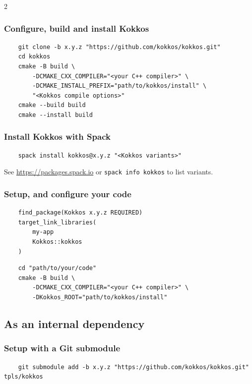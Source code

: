 \documentclass[
    kokkoshighlight,
]{./cheat_sheet_kokkos}
\begin{document}
\begin{multicols}{2}
\subsubsection{Configure, build and install Kokkos}

\begin{verbatim}
    git clone -b x.y.z "https://github.com/kokkos/kokkos.git"
    cd kokkos
    cmake -B build \
        -DCMAKE_CXX_COMPILER="<your C++ compiler>" \
        -DCMAKE_INSTALL_PREFIX="path/to/kokkos/install" \
        "<Kokkos compile options>"
    cmake --build build
    cmake --install build
\end{verbatim}

\subsubsection{Install Kokkos with Spack}

\begin{verbatim}
    spack install kokkos@x.y.z "<Kokkos variants>"
\end{verbatim}

See \url{https://packages.spack.io} or \texttt{spack info kokkos} to list variants.

\subsubsection{Setup, and configure your code}

\begin{verbatim}
    find_package(Kokkos x.y.z REQUIRED)
    target_link_libraries(
        my-app
        Kokkos::kokkos
    )
\end{verbatim}

\begin{verbatim}
    cd "path/to/your/code"
    cmake -B build \
        -DCMAKE_CXX_COMPILER="<your C++ compiler>" \
        -DKokkos_ROOT="path/to/kokkos/install"
\end{verbatim}

\subsection{As an internal dependency}

\subsubsection{Setup with a Git submodule}

\begin{verbatim}
    git submodule add -b x.y.z "https://github.com/kokkos/kokkos.git" tpls/kokkos
\end{verbatim}


\end{multicols}
\end{document}
